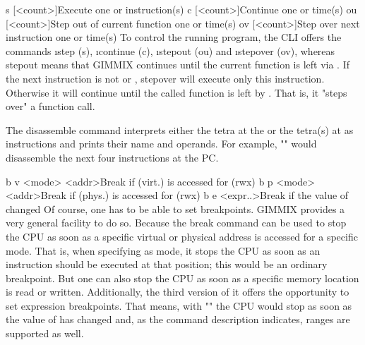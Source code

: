 \gcmdtblfour
	{s [<count>]}{Execute one or  instruction(s)}
	{c [<count>]}{Continue one or  time(s)}
	{ou [<count>]}{Step out of current function one or  time(s)}
	{ov [<count>]}{Step over next instruction one or  time(s)}
\noindent To control the running program, the CLI offers the commands \i{step} (s), \i{continue} (c), \i{stepout} (ou) and \i{stepover} (ov), whereas stepout means that GIMMIX continues until the current function is left via . If the next instruction is not  or , stepover will execute only this instruction. Otherwise it will continue until the called function is left by . That is, it "steps over" a function call.

\noindent The disassemble command interprets either the tetra at the  or the tetra(s) at  as instructions and prints their name and operands. For example, "" would disassemble the next four instructions at the \gls{PC}.

\gcmdtblthree
	{b v <mode> <addr>}{Break if  (virt.) is accessed for  (rwx)}
	{b p <mode> <addr>}{Break if  (phys.) is accessed for  (rwx)}
	{b e <expr..>}{Break if the value of  changed}
\noindent Of course, one has to be able to set breakpoints. GIMMIX provides a very general facility to do so. Because the break command  can be used to stop the CPU as soon as a specific virtual or physical address is accessed for a specific mode. That is, when specifying  as mode, it stops the CPU as soon as an instruction should be executed at that position; \ie this would be an ordinary breakpoint. But one can also stop the CPU as soon as a specific memory location is read or written. Additionally, the third version of it offers the opportunity to set expression breakpoints. That means, with "" the CPU would stop as soon as the value of  has changed and, as the command description indicates, ranges are supported as well.

